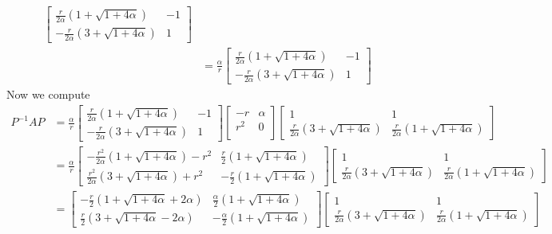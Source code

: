 \documentclass{article}
\begin{document}
\begin{solution}
\begin{align*}
\begin{bmatrix}
\frac{r}{2\alpha} \left( 1 + \sqrt{1 + 4\alpha}\right) & -1 \\
-\frac{r}{2\alpha} \left( 3 + \sqrt{1 + 4\alpha}\right) & 1
\end{bmatrix}\\
&= \frac{\alpha}{r}
\begin{bmatrix}
\frac{r}{2\alpha} \left( 1 + \sqrt{1 + 4\alpha}\right) & -1 \\
-\frac{r}{2\alpha} \left( 3 + \sqrt{1 + 4\alpha}\right) & 1
\end{bmatrix}
\end{align*}
Now we compute
\begin{align*}
P^{-1}AP &= \frac{\alpha}{r}
\begin{bmatrix}
\frac{r}{2\alpha} \left( 1 + \sqrt{1 + 4\alpha}\right) & -1 \\
-\frac{r}{2\alpha} \left( 3 + \sqrt{1 + 4\alpha}\right) & 1
\end{bmatrix}
\begin{bmatrix}
-r	&	\alpha	\\
r^{2}	&	0	\\
\end{bmatrix}
\begin{bmatrix}
1 & 1 \\
\frac{r}{2\alpha} \left( 3 + \sqrt{1 + 4\alpha}\right)
&
\frac{r}{2\alpha} \left( 1 + \sqrt{1 + 4\alpha}\right)
\end{bmatrix}
\\
&= \frac{\alpha}{r}
\begin{bmatrix}
-\frac{r^{2}}{2\alpha} \left( 1 + \sqrt{1 + 4\alpha}\right)-r^{2} 
&
\frac{r}{2} \left( 1 + \sqrt{1 + 4\alpha}\right) 
\\
\frac{r^{2}}{2\alpha} \left( 3 + \sqrt{1 + 4\alpha}\right)+r^{2} 
&
-\frac{r}{2} \left( 1 + \sqrt{1 + 4\alpha}\right)
\end{bmatrix}
\begin{bmatrix}
1 & 1 \\
\frac{r}{2\alpha} \left( 3 + \sqrt{1 + 4\alpha}\right)
&
\frac{r}{2\alpha} \left( 1 + \sqrt{1 + 4\alpha}\right)
\end{bmatrix}
\\
&=
\begin{bmatrix}
-\frac{r}{2} \left( 1 + \sqrt{1 + 4\alpha} + 2\alpha \right) 
&
\frac{\alpha}{2} \left( 1 + \sqrt{1 + 4\alpha}\right) 
\\
\frac{r}{2} \left( 3 + \sqrt{1 + 4\alpha} - 2\alpha \right) 
&
-\frac{\alpha}{2} \left( 1 + \sqrt{1 + 4\alpha}\right)
\end{bmatrix}
\begin{bmatrix}
1 & 1 \\
\frac{r}{2\alpha} \left( 3 + \sqrt{1 + 4\alpha}\right)
&
\frac{r}{2\alpha} \left( 1 + \sqrt{1 + 4\alpha}\right)
\end{bmatrix}
\end{align*}


\end{solution}
\end{document}
